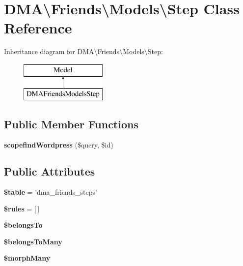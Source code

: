 \hypertarget{classDMA_1_1Friends_1_1Models_1_1Step}{\section{D\+M\+A\textbackslash{}Friends\textbackslash{}Models\textbackslash{}Step Class Reference}
\label{classDMA_1_1Friends_1_1Models_1_1Step}
}
Inheritance diagram for D\+M\+A\textbackslash{}Friends\textbackslash{}Models\textbackslash{}Step\+:\begin{figure}[H]
\begin{center}
\leavevmode
\includegraphics[height=2.000000cm]{d9/d03/classDMA_1_1Friends_1_1Models_1_1Step}
\end{center}
\end{figure}
\subsection*{Public Member Functions}
\begin{DoxyCompactItemize}
\item 
\hypertarget{classDMA_1_1Friends_1_1Models_1_1Step_a58a71b1c9b39249ac24484bbd2307db2}{{\bfseries scopefind\+Wordpress} (\$query, \$id)}\label{classDMA_1_1Friends_1_1Models_1_1Step_a58a71b1c9b39249ac24484bbd2307db2}

\end{DoxyCompactItemize}
\subsection*{Public Attributes}
\begin{DoxyCompactItemize}
\item 
\hypertarget{classDMA_1_1Friends_1_1Models_1_1Step_a73a0d48cb46b1aeeaad83499e8449acc}{{\bfseries \$table} = 'dma\+\_\+friends\+\_\+steps'}\label{classDMA_1_1Friends_1_1Models_1_1Step_a73a0d48cb46b1aeeaad83499e8449acc}

\item 
\hypertarget{classDMA_1_1Friends_1_1Models_1_1Step_a13476d5ca718080b85c9633270bf4942}{{\bfseries \$rules} = \mbox{[}$\,$\mbox{]}}\label{classDMA_1_1Friends_1_1Models_1_1Step_a13476d5ca718080b85c9633270bf4942}

\item 
{\bfseries \$belongs\+To}
\item 
{\bfseries \$belongs\+To\+Many}
\item 
{\bfseries \$morph\+Many}
\end{DoxyCompactItemize}
